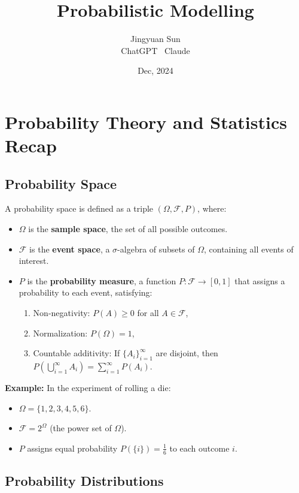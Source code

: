 \documentclass[12pt,a4paper]{article}
\title{\textbf{Probabilistic Modelling}}
\author{Jingyuan Sun \\ ChatGPT \ Claude}
\date{Dec, 2024}
\begin{document}
\maketitle

\section{Probability Theory and Statistics Recap}

\subsection{Probability Space}

A probability space is defined as a triple \((\Omega, \mathcal{F}, P)\), where:
\begin{itemize}
    \item \(\Omega\) is the \textbf{sample space}, the set of all possible outcomes.
    \item \(\mathcal{F}\) is the \textbf{event space}, a \(\sigma\)-algebra of subsets of \(\Omega\), containing all events of interest.
    \item \(P\) is the \textbf{probability measure}, a function \(P: \mathcal{F} \to [0,1]\) that assigns a probability to each event, satisfying:
    \begin{enumerate}
        \item Non-negativity: \(P(A) \geq 0\) for all \(A \in \mathcal{F}\),
        \item Normalization: \(P(\Omega) = 1\),
        \item Countable additivity: If \(\{A_i\}_{i=1}^\infty\) are disjoint, then \(P\left(\bigcup_{i=1}^\infty A_i\right) = \sum_{i=1}^\infty P(A_i)\).
    \end{enumerate}
\end{itemize}

\textbf{Example:} In the experiment of rolling a die:
\begin{itemize}
    \item \(\Omega = \{1, 2, 3, 4, 5, 6\}\).
    \item \(\mathcal{F} = 2^\Omega\) (the power set of \(\Omega\)).
    \item \(P\) assigns equal probability \(P(\{i\}) = \frac{1}{6}\) to each outcome \(i\).
\end{itemize}

\subsection{Probability Distributions}
\end{document}
